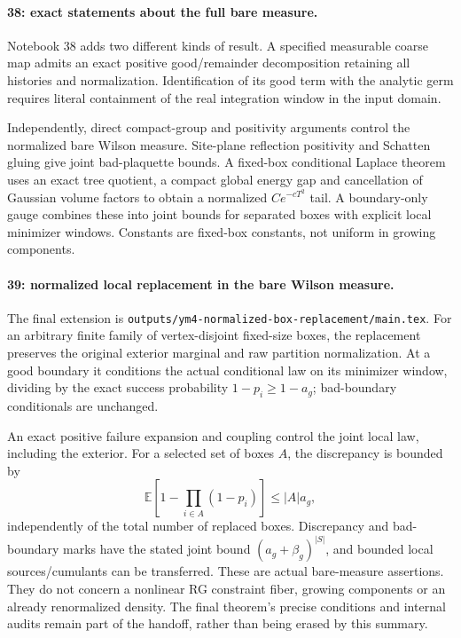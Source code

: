 \documentclass[11pt]{article}
\providecommand{\hrbpath}[1]{\nolinkurl{#1}}
\theoremstyle{remark}
\begin{document}
\paragraph{38: exact statements about the full bare measure.}
Notebook 38 adds two different kinds
of result. A specified measurable coarse
map admits an exact positive good/remainder
decomposition retaining all histories
and normalization. Identification of
its good term with the analytic germ
requires literal containment of the real
integration window in the input domain.

Independently, direct compact-group
and positivity arguments control the
normalized bare Wilson measure.
Site-plane reflection positivity and
Schatten gluing give joint bad-plaquette
bounds. A fixed-box conditional Laplace
theorem uses an exact tree quotient,
a compact global energy gap and
cancellation of Gaussian volume factors
to obtain a normalized \(Ce^{-cT^2}\)
tail. A boundary-only gauge combines
these into joint bounds for separated
boxes with explicit local minimizer
windows. Constants are fixed-box
constants, not uniform in growing
components.

\paragraph{39: normalized local replacement in the bare Wilson measure.}
The final extension is
\hrbpath{outputs/ym4-normalized-box-replacement/main.tex}.
For an arbitrary finite family of
vertex-disjoint fixed-size boxes,
the replacement preserves the original
exterior marginal and raw partition
normalization. At a good boundary it
conditions the actual conditional law
on its minimizer window, dividing by
the exact success probability
\(1-p_i\geq1-a_g\); bad-boundary
conditionals are unchanged.

An exact positive failure expansion
and coupling control the joint local
law, including the exterior. For a
selected set of boxes \(A\), the
discrepancy is bounded by
\[
 \mathbb E\!\left[1-\prod_{i\in A}(1-p_i)\right]
 \leq |A|a_g ,
\]
independently of the total number of
replaced boxes. Discrepancy and bad-boundary
marks have the stated joint bound
\((a_g+\beta_g)^{|S|}\), and bounded
local sources/cumulants can be transferred.
These are actual bare-measure assertions.
They do not concern a nonlinear
RG constraint fiber, growing components
or an already renormalized density.
The final theorem's precise conditions
and internal audits remain part of
the handoff, rather than being erased
by this summary.
\end{document}

